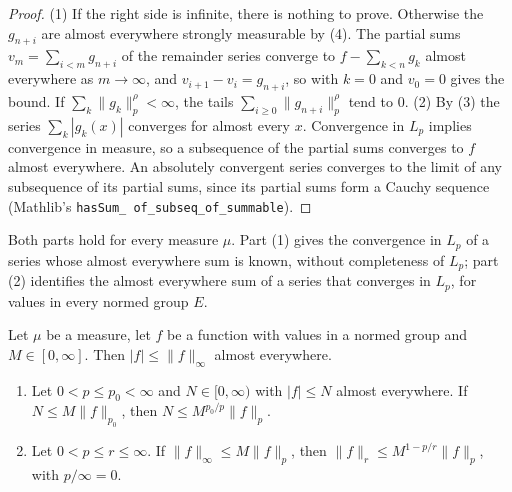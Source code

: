 \begin{proof}
\leanok
{}
(1) If the right side is infinite, there is nothing to prove. Otherwise the $g_{n+i}$ are almost
everywhere strongly measurable by (4). The partial sums
$v_m = \sum_{i<m} g_{n+i}$ of the remainder series converge to $f - \sum_{k<n} g_k$ almost
everywhere as $m \to \infty$, and $v_{i+1} - v_i = g_{n+i}$, so 
with $k = 0$ and $v_0 = 0$ gives the bound. If $\sum_k \|g_k\|_p^\rho < \infty$, the tails
$\sum_{i \geq 0} \|g_{n+i}\|_p^\rho$ tend to $0$. (2) By (3)
the series $\sum_k |g_k(x)|$ converges for almost every $x$. Convergence in $L_p$ implies
convergence in measure, so a subsequence of the partial sums converges to $f$ almost everywhere.
An absolutely convergent series converges to the limit of any subsequence of its partial sums,
since its partial sums form a Cauchy sequence (Mathlib's \texttt{hasSum\_\allowbreak
of\_\allowbreak subseq\_\allowbreak of\_\allowbreak summable}).
\end{proof}

Both parts hold for every measure $\mu$. Part (1) gives the convergence in $L_p$ of a series whose
almost everywhere sum is known, without completeness of $L_p$; part (2) identifies the almost
everywhere sum of a series that converges in $L_p$, for values in every normed group $E$.

\begin{lemma}
\label{lem:sup-bound-exponents}
\leanok
Let $\mu$ be a measure, let $f$ be a function with values in a normed group and
$M \in [0, \infty]$. Then $|f| \leq \|f\|_\infty$ almost everywhere.
\begin{enumerate}
  \item Let $0 < p \leq p_0 < \infty$ and $N \in [0, \infty)$ with $|f| \leq N$ almost
    everywhere. If $N \leq M \|f\|_{p_0}$, then $N \leq M^{p_0/p} \|f\|_p$.
  \item Let $0 < p \leq r \leq \infty$. If $\|f\|_\infty \leq M \|f\|_p$, then
    $\|f\|_r \leq M^{1 - p/r} \|f\|_p$, with $p/\infty = 0$.
\end{enumerate}
\end{lemma}

